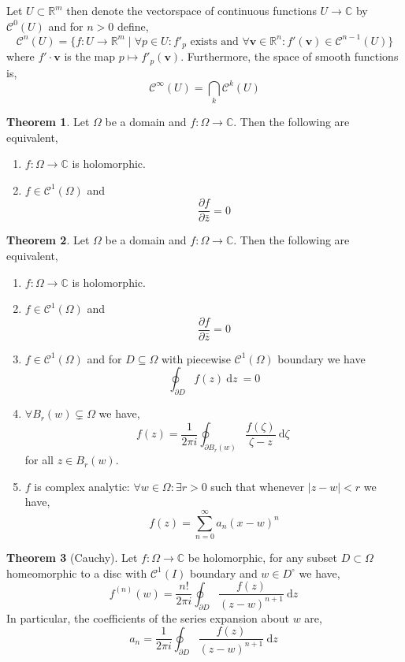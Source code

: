 \documentclass[12pt]{extarticle}
\newcommand{\R}{\mathbb{R}}
\newcommand{\C}{\mathbb{C}}
\renewcommand{\d}[1]{\: \mathrm{d}#1 \:}
\newcommand{\pderiv}[2]{\frac{\partial{#1}}{\partial{#2}}}
\theoremstyle{definition}
\newtheorem{theorem}{Theorem}[section]
\newenvironment{definition}[1][Definition:]{\begin{trivlist}
\item[\hskip \labelsep {\bfseries #1}]}{\end{trivlist}}
\renewcommand{\bf}[1]{\mathbf{#1}}
\newcommand{\Class}[2]{\mathcal{C}^{#1} \left( #2 \right)}
\begin{document}
\begin{definition}
Let $U \subset \R^m$ then denote the vectorspace of continuous functions $U \to \C$ by $\Class{0}{U}$ and for $n > 0$ define, 
\[ \Class{n}{U} = \{ f : U \to \R^m \mid \forall p \in U : f'_p \text{ exists and } \forall \bf{v} \in \R^n : f'(\bf{v}) \in \Class{n-1}{U} \} \] 
where $f' \cdot \bf{v}$ is the map $p \mapsto f'_p(\bf{v})$. Furthermore, the space of smooth functions is,
\[ \Class{\infty}{U} = \bigcap_{k} \Class{k}{U} \] 
\end{definition}

\begin{theorem}
Let $\Omega$ be a domain and $f : \Omega \to \C$. Then the following are equivalent,
\begin{enumerate}
\item $f : \Omega \to \C$ is holomorphic.
\item $f \in \Class{1}{\Omega}$ and 
\[ \pderiv{f}{\bar{z}} = 0 \]
\end{enumerate}
\end{theorem}

\begin{theorem}
Let $\Omega$ be a domain and $f : \Omega \to \C$. Then the following are equivalent,
\begin{enumerate}
\item $f : \Omega \to \C$ is holomorphic.
\item $f \in \Class{1}{\Omega}$ and 
\[ \pderiv{f}{\bar{z}} = 0 \]
\item $f \in \Class{1}{\Omega}$ and for $D \subseteq \Omega$ with piecewise $\Class{1}{\Omega}$ boundary we have \[ \oint_{\partial D} f(z) \d{z} = 0 \]
\item $\forall B_{r}(w) \subsetneq \Omega$ we have,
\[ f(z) = \frac{1}{2 \pi i} \oint_{\partial B_{r}(w)} \frac{f(\zeta)}{\zeta - z} \d{\zeta} \] 
for all $z \in B_r(w)$. 
\item $f$ is complex analytic: $\forall w  \in \Omega : \exists r > 0$ such that whenever $|z - w| < r$ we have,
\[ f(z) = \sum_{n = 0}^\infty a_n(x - w)^n \]
\end{enumerate}
\end{theorem}

\begin{theorem}[Cauchy]
Let $f : \Omega \to \C$ be holomorphic, for any subset $D \subset \Omega$ homeomorphic to a disc with $\Class{1}{I}$ boundary and $w \in D^\circ$ we have,
\[ f^{(n)}(w) = \frac{n !}{2 \pi i} \oint_{\partial D} \frac{f(z)}{(z - w)^{n+1}} \d{z} \]
In particular, the coefficients of the series expansion about $w$ are,
\[ a_n = \frac{1}{2 \pi i} \oint_{\partial D} \frac{f(z)}{(z - w)^{n+1}} \d{z} \]
\end{theorem}
\end{document}
